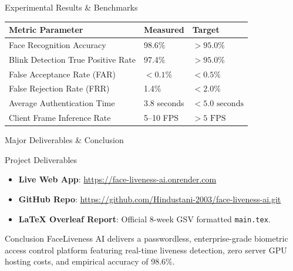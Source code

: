 \documentclass[aspectratio=169, 11pt]{beamer}
\begin{document}
\begin{frame}{Experimental Results \& Benchmarks}
\centering
\renewcommand{\arraystretch}{1.3}
\begin{tabular}{|p{6.0cm}|p{2.5cm}|p{2.5cm}|}
\hline
\rowcolor{gray!20} \textbf{Metric Parameter} & \textbf{Measured} & \textbf{Target} \\ \hline
Face Recognition Accuracy & 98.6\% & $> 95.0\%$ \\ \hline
Blink Detection True Positive Rate & 97.4\% & $> 95.0\%$ \\ \hline
False Acceptance Rate (FAR) & $< 0.1\%$ & $< 0.5\%$ \\ \hline
False Rejection Rate (FRR) & 1.4\% & $< 2.0\%$ \\ \hline
Average Authentication Time & 3.8 seconds & $< 5.0\text{ seconds}$ \\ \hline
Client Frame Inference Rate & 5--10 FPS & $> 5\text{ FPS}$ \\ \hline
\end{tabular}
\end{frame}

\begin{frame}{Major Deliverables \& Conclusion}
\begin{block}{Project Deliverables}
\begin{itemize}
    \item \textbf{Live Web App}: \url{https://face-liveness-ai.onrender.com}
    \item \textbf{GitHub Repo}: \url{https://github.com/Hindustani-2003/face-liveness-ai.git}
    \item \textbf{LaTeX Overleaf Report}: Official 8-week GSV formatted \texttt{main.tex}.
\end{itemize}
\end{block}

\begin{block}{Conclusion}
FaceLiveness AI delivers a passwordless, enterprise-grade biometric access control platform featuring real-time liveness detection, zero server GPU hosting costs, and empirical accuracy of 98.6\%.
\end{block}
\end{frame}
\end{document}
